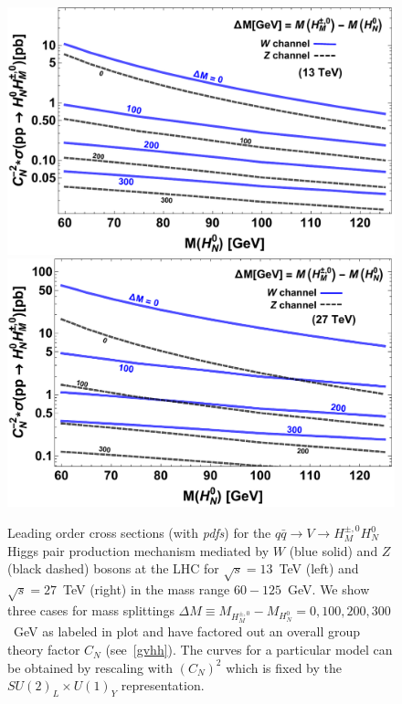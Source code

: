 \documentclass[../report.tex]{subfiles}
\begin{document}
\begin{figure}[tbh]
\begin{center}
\includegraphics[scale=.403]{FigsLowMassHiggs/CxnVsMHoDelM_13TeV.pdf}
\includegraphics[scale=.4]{FigsLowMassHiggs/CxnVsMHoDelM_27TeV.pdf}
\end{center}
\caption{Leading order cross sections (with \emph{pdfs}) for the $q\bar{q} \to V \to H_M^{\pm,0} H_N^0$ Higgs pair production mechanism mediated by $W$ (blue solid) and $Z$ (black dashed) bosons at the LHC for $\sqrt{s}=13$~TeV (left) and $\sqrt{s}=27$~TeV (right) in the mass range $60 - 125$~GeV. We show three cases for mass splittings $\Delta M \equiv M_{H^{\pm,0}_M} - M_{H_N^0}= 0, 100, 200, 300$~GeV as labeled in plot and have factored out an overall group theory factor $C_N$ (see~\ref{gvhh}). The curves for a particular model can be obtained by rescaling with $(C_N)^2$ which is fixed by the $SU(2)_L\times U(1)_Y$ representation.} 
\label{fig:HHprod}
\end{figure}
\end{document}

